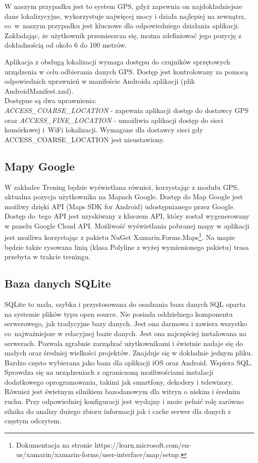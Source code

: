 W naszym przypadku jest to system GPS, gdyż zapewnia on najdokładniejsze dane lokalizycyjne, wykorzystuje najwięcej mocy i działa najlepiej na zewnątrz, co~w~naszym przypadku jest kluczowe dla odpowiedniego działania aplikacji. Zakładając, że użytkownik przemieszcza się, można zdefiniować jego pozycję z dokładnością od około 6 do 100 metrów.

Aplikacja z obsługą lokalizacji wymaga dostępu do czujników sprzętowych urządzenia w celu odbierania danych GPS. Dostęp jest kontrolowany za pomocą odpowiednich uprawnień w manifeście Androida aplikacji (plik AndroidManifest.xml). \\ Dostępne są dwa uprawnienia: \\ \textit{ACCESS\_COARSE\_LOCATION} - zapewnia aplikacji dostęp do dostawcy GPS oraz \textit{ACCESS\_FINE\_LOCATION} - umożliwia aplikacji dostęp do sieci komórkowej i~WiFi lokalizacji. Wymagane dla dostawcy sieci gdy ACCESS\_COARSE\_LOCATION jest nieustawiony.

\subsection{Mapy Google}  %

\hspace{0.60cm}W zakładce Trening będzie wyświetlana również, korzystając z modułu GPS, aktualna pozycja użytkownika na Mapach Google. Dostęp do Map Google jest możliwy dzięki API (Maps SDK for Android) udostępnianego przez Google. Dostęp do~tego API jest uzyskiwany z kluczem API, który został wygenerowany w panelu Google Cloud API. Możliwość wyświetlania pobranej mapy w aplikacji jest możliwa korzystając z pakietu NuGet Xamarin.Forms.Maps\footnote{Dokumentacja na stronie   https://learn.microsoft.com/en-us/xamarin/xamarin-forms/user-interface/map/setup\cite{www3}.}. Na mapie będzie także rysowana linią (klasa Polyline z wyżej wymienionego pakietu) trasa przebyta w trakcie treningu. 

\subsection{Baza danych SQLite} %

\hspace{0.60cm}SQLite to mała, szybka i przystosowana do osadzania baza danych SQL oparta na systemie plików typu open source. Nie posiada oddzielnego komponentu serwerowego, jak tradycyjne bazy danych. Jest ona darmowa i zawiera wszystko co~najważniejsze w relacyjnej bazie danych. Jest ona najczęściej instalowana na serwerach. Pozwala zgrabnie zarządzać użytkownikami i świetnie nadaje się do małych oraz średniej wielkości projektów. Znajduje się w dokładnie jednym pliku. Bardzo często wybierana jako baza dla aplikacji iOS oraz Android. Wspiera SQL. Sprawdza się na urządzeniach z ograniczoną możliwościami instalacji dodatkowego oprogramowania, takimi jak smartfony, dekodery i telewizory. Również jest świetnym silnikiem bazodanowym dla witryn o niskim i średnim ruchu. Przy odpowiedniej konfiguracji jest wydajny i może pełnić rolę zarówno silnika do analizy dużego zbioru informacji jak i cache serwer dla danych z częstym odczytem.


